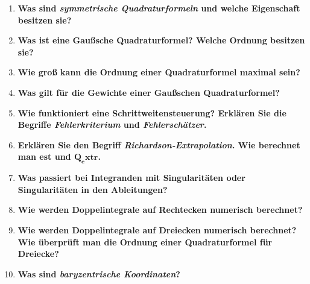\begin{enumerate}
		\item \textbf{Was sind \textit{symmetrische Quadraturformeln} und welche Eigenschaft besitzen sie?} \\
		
		\item \textbf{Was ist eine Gaußsche Quadraturformel? Welche Ordnung besitzen sie?} \\
		
		\item \textbf{Wie groß kann die Ordnung einer Quadraturformel maximal sein?} \\
		
		\item \textbf{Was gilt für die Gewichte einer Gaußschen Quadraturformel?} \\
		
		\item \textbf{Wie funktioniert eine Schrittweitensteuerung? Erklären Sie die Begriffe \textit{Fehlerkriterium} und \textit{Fehlerschätzer}.} \\
		
		\item \textbf{Erklären Sie den Begriff \textit{Richardson-Extrapolation}. Wie berechnet man est und $\mathbf{Q_extr}$.} \\
		
		\item \textbf{Was passiert bei Integranden mit Singularitäten oder Singularitäten in den Ableitungen?} \\
		
		\item \textbf{Wie werden Doppelintegrale auf Rechtecken numerisch berechnet?} \\
		
		\item \textbf{Wie werden Doppelintegrale auf Dreiecken numerisch berechnet? Wie überprüft man die Ordnung einer Quadraturformel für Dreiecke?} \\
		
		\item \textbf{Was sind \textit{baryzentrische Koordinaten}?} \\
		
	\end{enumerate}